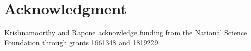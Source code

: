 \section*{Acknowledgment}

Krishnamoorthy and Rapone acknowledge funding from the National Science Foundation through grants 1661348 and 1819229.
